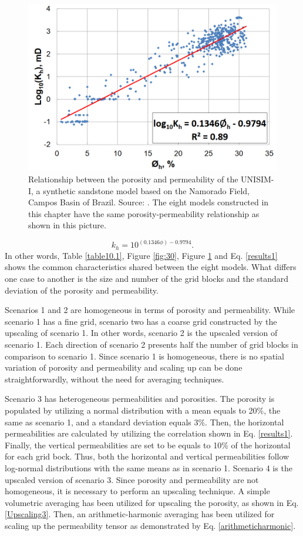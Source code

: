\begin{figure}[H]
	\centering
	\includegraphics[width=0.8\linewidth]{Images/35}
	\caption{Relationship between the porosity and permeability of the UNISIM-I, a synthetic sandstone model based on the Namorado Field, Campos Basin of Brazil. Source: \cite{Avansi2015}. The eight models constructed in this chapter have the same porosity-permeability relationship as shown in this picture.}
	\label{fig:35}
\end{figure}
\begin{equation}\label{results1}
k_h = 10^{(0.1346\phi)-0.9794}.
\end{equation}
In other words, Table \ref{table10.1}, Figure \ref{fig:30}, Figure \ref{fig:35} and Eq. \ref{results1} shows the common characteristics shared between the eight models. What differs one case to another is the size and number of the grid blocks and the standard deviation of the porosity and permeability. 

Scenarios 1 and 2 are homogeneous in terms of porosity and permeability. While scenario 1 has a fine grid, scenario two has a coarse grid constructed by the upscaling of scenario 1. In other words, scenario 2 is the upscaled version of scenario 1. Each direction of scenario 2 presents half the number of grid blocks in comparison to scenario 1. Since scenario 1 is homogeneous, there is no spatial variation of porosity and permeability and scaling up can be done straightforwardly, without the need for averaging techniques.

Scenario 3 has heterogeneous permeabilities and porosities. The porosity is populated by utilizing a normal distribution with a mean equals to 20\%, the same as scenario 1, and a standard deviation equals 3\%. Then, the horizontal permeabilities are calculated by utilizing the correlation shown in Eq. \ref{results1}. Finally, the vertical permeabilities are set to be equals to 10\% of the horizontal for each grid bock. Thus, both the horizontal and vertical permeabilities follow log-normal distributions with the same means as in scenario 1. Scenario 4 is the upscaled version of scenario 3. Since porosity and permeability are not homogeneous, it is necessary to perform an upscaling technique. A simple volumetric averaging has been utilized for upscaling the porosity, as shown in Eq. \ref{Upscaling3}. Then, an arithmetic-harmonic averaging has been utilized for scaling up the permeability tensor as demonstrated by Eq. \ref{arithmeticharmonic}.  

